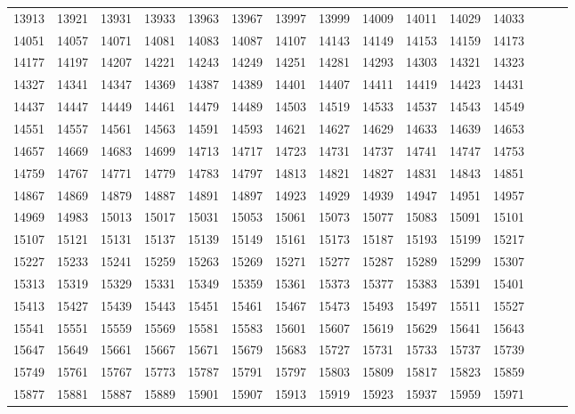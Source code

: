 \documentclass[10pt, a4paper]{article}
\begin{document}
\begin{center}
\begin{longtable}{c c c c c c c c c c c c c c c}
        13913 & 13921 & 13931 & 13933 & 13963 & 13967 & 13997 & 13999 & 14009 & 14011 & 14029 & 14033 \\
        14051 & 14057 & 14071 & 14081 & 14083 & 14087 & 14107 & 14143 & 14149 & 14153 & 14159 & 14173 \\
        14177 & 14197 & 14207 & 14221 & 14243 & 14249 & 14251 & 14281 & 14293 & 14303 & 14321 & 14323 \\
        14327 & 14341 & 14347 & 14369 & 14387 & 14389 & 14401 & 14407 & 14411 & 14419 & 14423 & 14431 \\
        14437 & 14447 & 14449 & 14461 & 14479 & 14489 & 14503 & 14519 & 14533 & 14537 & 14543 & 14549 \\
        14551 & 14557 & 14561 & 14563 & 14591 & 14593 & 14621 & 14627 & 14629 & 14633 & 14639 & 14653 \\
        14657 & 14669 & 14683 & 14699 & 14713 & 14717 & 14723 & 14731 & 14737 & 14741 & 14747 & 14753 \\
        14759 & 14767 & 14771 & 14779 & 14783 & 14797 & 14813 & 14821 & 14827 & 14831 & 14843 & 14851 \\
        14867 & 14869 & 14879 & 14887 & 14891 & 14897 & 14923 & 14929 & 14939 & 14947 & 14951 & 14957 \\
        14969 & 14983 & 15013 & 15017 & 15031 & 15053 & 15061 & 15073 & 15077 & 15083 & 15091 & 15101 \\
        15107 & 15121 & 15131 & 15137 & 15139 & 15149 & 15161 & 15173 & 15187 & 15193 & 15199 & 15217 \\
        15227 & 15233 & 15241 & 15259 & 15263 & 15269 & 15271 & 15277 & 15287 & 15289 & 15299 & 15307 \\
        15313 & 15319 & 15329 & 15331 & 15349 & 15359 & 15361 & 15373 & 15377 & 15383 & 15391 & 15401 \\
        15413 & 15427 & 15439 & 15443 & 15451 & 15461 & 15467 & 15473 & 15493 & 15497 & 15511 & 15527 \\
        15541 & 15551 & 15559 & 15569 & 15581 & 15583 & 15601 & 15607 & 15619 & 15629 & 15641 & 15643 \\
        15647 & 15649 & 15661 & 15667 & 15671 & 15679 & 15683 & 15727 & 15731 & 15733 & 15737 & 15739 \\
        15749 & 15761 & 15767 & 15773 & 15787 & 15791 & 15797 & 15803 & 15809 & 15817 & 15823 & 15859 \\
        15877 & 15881 & 15887 & 15889 & 15901 & 15907 & 15913 & 15919 & 15923 & 15937 & 15959 & 15971 \\

\end{longtable}
\end{center}
\end{document}
